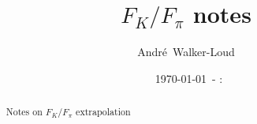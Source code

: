 \documentclass[prd,11pt,tightenlines,preprintnumbers,showpacs,superscriptaddress,notitlepage,nofootinbib,eqsecnum,floatfix]{revtex4-1}
\newcommand{\mydate}{\ \today \ - \number\hour :\number\minute}
\begin{document}
\title{$F_K / F_\pi$ notes}




%
%
%
%
%
%
%
%
%
%
%

\author{Andr\'{e}~Walker-Loud}

\date{\mydate}

\begin{abstract}
Notes on $F_K/F_\pi$ extrapolation
\end{abstract}
\maketitle

\end{document}
